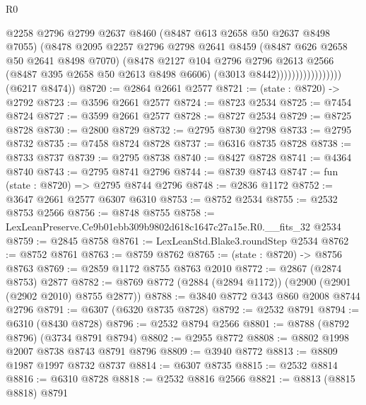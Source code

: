 \begin{lexlean}{R0}
\begin{coremodule}
                                  @2258
                                  @2796
                                  @2799
                                  @2637
                                  @8460
                                  (@8487 @613 @2658 @50 @2637 @8498 @7055)
                                  (@8478
                                    @2095
                                    @2257
                                    @2796
                                    @2798
                                    @2641
                                    @8459
                                    (@8487 @626 @2658 @50 @2641 @8498 @7070)
                                    (@8478
                                      @2127
                                      @104
                                      @2796
                                      @2796
                                      @2613
                                      @2566
                                      (@8487 @395 @2658 @50 @2613 @8498 @6606)
                                      (@3013 @8442)))))))))))))))))
      (@6217 @8474))
@8720 := @2864 @2661 @2577
@8721 := (state : @8720) -> @2792
@8723 := @3596 @2661 @2577
@8724 := @8723 @2534
@8725 := @7454 @8724
@8727 := @3599 @2661 @2577
@8728 := @8727 @2534
@8729 := @8725 @8728
@8730 := @2800 @8729
@8732 := @2795 @8730 @2798
@8733 := @2795 @8732
@8735 := @7458 @8724 @8728
@8737 := @6316 @8735 @8728
@8738 := @8733 @8737
@8739 := @2795 @8738
@8740 := @8427 @8728
@8741 := @4364 @8740
@8743 := @2795 @8741 @2796
@8744 := @8739 @8743
@8747 := fun (state : @8720) => @2795 @8744 @2796
@8748 := @2836 @1172
@8752 := @3647 @2661 @2577 @6307 @6310
@8753 := @8752 @2534
@8755 := @2532 @8753 @2566
@8756 := @8748 @8755
@8758 := LexLeanPreserve.Ce9b01ebb309b9802d618c1647c27a15e.R0.__fits_32 @2534
@8759 := @2845 @8758
@8761 := LexLeanStd.Blake3.roundStep @2534
@8762 := @8752 @8761
@8763 := @8759 @8762
@8765 := (state : @8720) -> @8756 @8763
@8769 := @2859 @1172 @8755 @8763 @2010
@8772 := @2867 (@2874 @8753) @2877
@8782 := @8769 @8772 (@2884 (@2894 @1172)) (@2900 (@2901 (@2902 @2010) @8755 @2877))
@8788 := @3840 @8772 @343 @860 @2008 @8744 @2796
@8791 := @6307 (@6320 @8735 @8728)
@8792 := @2532 @8791
@8794 := @6310 (@8430 @8728)
@8796 := @2532 @8794 @2566
@8801 := @8788 (@8792 @8796) (@3734 @8791 @8794)
@8802 := @2955 @8772
@8808 := @8802 @1998 @2007 @8738 @8743 @8791 @8796
@8809 := @3940 @8772
@8813 := @8809 @1987 @1997 @8732 @8737
@8814 := @6307 @8735
@8815 := @2532 @8814
@8816 := @6310 @8728
@8818 := @2532 @8816 @2566
@8821 := @8813 (@8815 @8818) @8791

\end{coremodule}
\end{lexlean}
